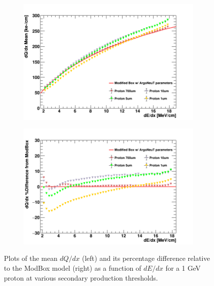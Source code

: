 \begin{figure}[htbp!]
        \begin{subfigure}[b]{0.495\textwidth}   
            \centering 
            \includegraphics[width=\textwidth]{proton_profile}
            \caption{}%
            \label{fig:proton_range_delta_magnitude}
        \end{subfigure}
        \hfill
        \begin{subfigure}[b]{0.495\textwidth}   
            \centering 
            \includegraphics[width=\textwidth]{proton_profile_diff}
            \caption{}%
            \label{fig:proton_range_delta_diff}
        \end{subfigure}
        \caption{Plots of the mean $dQ/dx$ (left) and its percentage difference relative to the ModBox model (right) as a function of $dE/dx$ for a 1 GeV proton at various secondary production thresholds. }
        \label{fig:proton_range_delta}
\end{figure}

